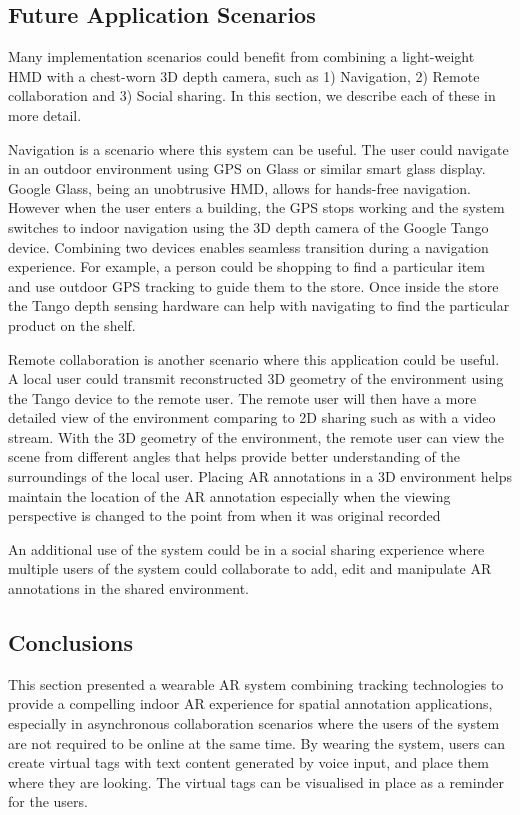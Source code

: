 \subsection{Future Application Scenarios}

Many implementation scenarios could benefit from combining a light-weight HMD with a chest-worn 3D depth camera, such as 1) Navigation, 2) Remote collaboration and 3) Social sharing. In this section, we describe each of these in more detail.

Navigation is a scenario where this system can be useful. The user could navigate in an outdoor environment using GPS on Glass or similar smart glass display. Google Glass, being an unobtrusive HMD, allows for hands-free navigation. However when the user enters a building, the GPS stops working and the system switches to indoor navigation using the 3D depth camera of the Google Tango device. Combining two devices enables seamless transition during a navigation experience. For example, a person could be shopping to find a particular item and use outdoor GPS tracking to guide them to the store. Once inside the store the Tango depth sensing hardware can help with navigating to find the particular product on the shelf.

Remote collaboration is another scenario where this application could be useful. A local user could transmit reconstructed 3D geometry of the environment using the Tango device to the remote user. The remote user will then have a more detailed view of the environment comparing to 2D sharing such as with a video stream. With the 3D geometry of the environment, the remote user can view the scene from different angles that helps provide better understanding of the surroundings of the local user. Placing AR annotations in a 3D environment helps maintain the location of the AR annotation especially when the viewing perspective is changed to the point from when it was original recorded

An additional use of the system could be in a social sharing experience where multiple users of the system could collaborate to add, edit and manipulate AR annotations in the shared environment. 

\subsection{Conclusions}

This section presented a wearable AR system combining tracking technologies to provide a compelling indoor AR experience for spatial annotation applications, especially in asynchronous collaboration scenarios where the users of the system are not required to be online at the same time. By wearing the system, users can create virtual tags with text content generated by voice input, and place them where they are looking. The virtual tags can be visualised in place as a reminder for the users.  
